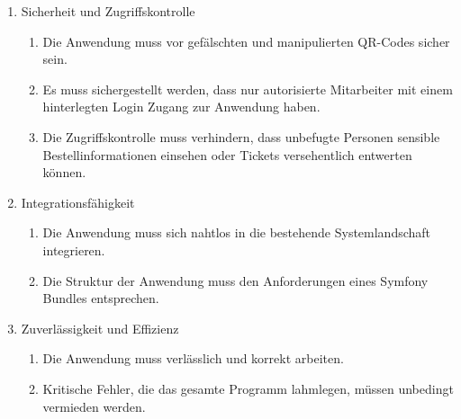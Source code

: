 \begin{enumerate}[itemsep=0em,partopsep=0em,parsep=0em,topsep=0em]
    \item Sicherheit und Zugriffskontrolle
    \begin{enumerate}
        \item Die Anwendung muss vor gefälschten und manipulierten QR-Codes sicher sein.
        \item Es muss sichergestellt werden, dass nur autorisierte Mitarbeiter mit einem hinterlegten Login Zugang zur Anwendung haben.
        \item Die Zugriffskontrolle muss verhindern, dass unbefugte Personen sensible Bestellinformationen einsehen oder Tickets versehentlich entwerten können.
    \end{enumerate}

    \item Integrationsfähigkeit
    \begin{enumerate}
        \item Die Anwendung muss sich nahtlos in die bestehende Systemlandschaft integrieren.
        \item Die Struktur der Anwendung muss den Anforderungen eines Symfony Bundles entsprechen.
    \end{enumerate}

    \item Zuverlässigkeit und Effizienz
    \begin{enumerate}
        \item Die Anwendung muss verlässlich und korrekt arbeiten.
        \item Kritische Fehler, die das gesamte Programm lahmlegen, müssen unbedingt vermieden werden.
    \end{enumerate}
\end{enumerate}

